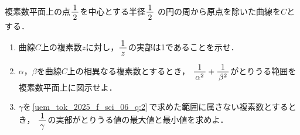 ﻿\documentclass[../../../uem_tok_q.tex]{subfiles}
\begin{document}
    複素数平面上の点$\myfraca{1}{2}$を中心とする半径$\myfraca{1}{2}$%
    の円の周から原点を除いた曲線を$C$とする．%

    \begin{enumerate}
        \item 曲線$C$上の複素数$z$に対し，$\myfraca{1}{z}$の実部は1であることを示せ．
        \item $\alpha$，$\beta$を曲線$C$上の相異なる複素数とするとき，%
            $\myfraca{1}{\alpha^2}+\myfraca{1}{\beta^2}$がとりうる範囲を複素数平面上に図示せよ．%
            \label{uem_tok_2025_f_sci_06_q:2}
        \item $\gamma$を\,\ref{uem_tok_2025_f_sci_06_q:2}\,で求めた範囲に属さない複素数とするとき，%
            $\myfraca{1}{\gamma}$の実部がとりうる値の最大値と最小値を求めよ．
    \end{enumerate}
\end{document}
